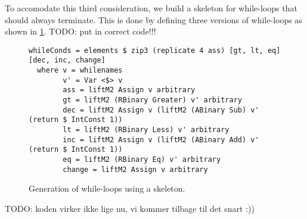 To accomodate this third consideration, we build a skeleton for while-loops that should always terminate. This is done by defining three versions of while-loops as shown in \cref{fig:genwhile}.
TODO: put in correct code!!!
\begin{figure}
\begin{lstlisting}
whileConds = elements $ zip3 (replicate 4 ass) [gt, lt, eq] [dec, inc, change]
  where v = whilenames
        v' = Var <$> v
        ass = liftM2 Assign v arbitrary
        gt = liftM2 (RBinary Greater) v' arbitrary
        dec = liftM2 Assign v (liftM2 (ABinary Sub) v' (return $ IntConst 1))
        lt = liftM2 (RBinary Less) v' arbitrary
        inc = liftM2 Assign v (liftM2 (ABinary Add) v' (return $ IntConst 1))
        eq = liftM2 (RBinary Eq) v' arbitrary
        change = liftM2 Assign v arbitrary
\end{lstlisting}
\caption{Generation of while-loops using a skeleton.}
\label{fig:genwhile}
\end{figure}

TODO: koden virker ikke lige nu, vi kommer tilbage til det snart :))


